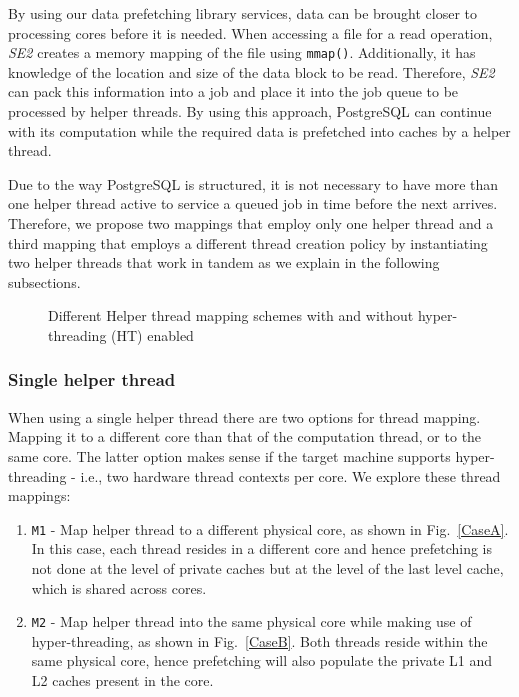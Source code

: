 By using our data prefetching library services, data can be brought closer to processing cores before 
it is needed. When accessing a file for a read operation, \emph{SE2} creates a memory mapping of the file 
using \verb+mmap()+. Additionally, it has knowledge of the location and size of the data block to be read. Therefore, \emph{SE2} can pack this information into a job and place it into the job queue to be processed by helper threads. By using this approach, PostgreSQL can continue with its computation while the required data is prefetched into caches by a helper thread. 

Due to the way PostgreSQL is structured, it is not necessary to have more than one helper thread active to service a queued job in time before the next arrives. Therefore, we propose two mappings that employ only one helper thread and a third mapping that employs a different thread creation policy by instantiating two helper threads that work in tandem as we explain in the following subsections.

\begin{figure*} %
\centering     %
{}
\caption{Different Helper thread mapping schemes with and without hyper-threading (HT) enabled}
\label{Thread-Mapping}
\end{figure*}


\subsubsection{Single helper thread}



When using a single helper thread there are two options for thread mapping. Mapping it to a different core than that of the computation thread, or to the same core. The latter option makes sense if the target machine supports hyper-threading - i.e., two hardware thread contexts per core. We explore these thread mappings:
\begin{enumerate}
 \item \verb+M1+ - Map helper thread to a different physical core, as shown in Fig.~\ref{CaseA}. In this case, each thread resides in a different core and hence prefetching is not done at the level of private caches but at the level of the last level cache, which is shared across cores.
 \item \verb+M2+ - Map helper thread into the same physical core while making use of hyper-threading, as shown in Fig.~\ref{CaseB}. Both threads reside within the same physical core, hence prefetching will also populate the private L1 and L2 caches present in the core.
\end{enumerate}

